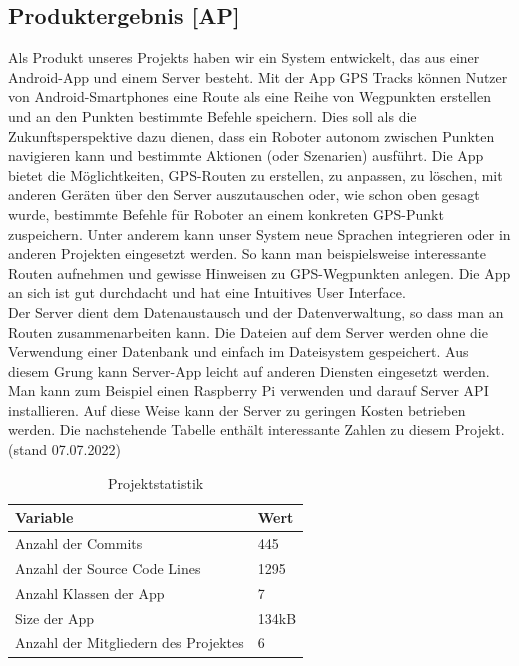 \documentclass[10pt]{article}
\begin{document}
\subsection{Produktergebnis [AP]}
    Als Produkt unseres Projekts haben wir ein System entwickelt, das aus einer Android-App und einem Server besteht.
    Mit der App GPS Tracks können Nutzer von Android-Smartphones eine Route als eine Reihe von Wegpunkten erstellen und an den Punkten bestimmte Befehle speichern.
    Dies soll als die Zukunftsperspektive dazu dienen, dass ein Roboter autonom zwischen Punkten navigieren kann und bestimmte Aktionen (oder Szenarien) ausführt. 
    Die App bietet die Möglichtkeiten, GPS-Routen zu erstellen, zu anpassen, zu löschen, mit anderen Geräten über den Server auszutauschen oder, wie schon oben gesagt wurde, bestimmte Befehle für Roboter
    an einem konkreten GPS-Punkt zuspeichern. Unter anderem kann unser System neue Sprachen integrieren oder in anderen Projekten eingesetzt werden. So kann man beispielsweise interessante Routen aufnehmen und gewisse Hinweisen zu GPS-Wegpunkten anlegen.
    Die App an sich ist gut durchdacht und hat eine Intuitives User Interface. \\ 
    Der Server dient dem Datenaustausch und der Datenverwaltung, so dass man an Routen zusammenarbeiten kann. Die Dateien auf dem Server werden ohne die Verwendung einer Datenbank
    und einfach im Dateisystem gespeichert. Aus diesem Grung kann Server-App leicht auf anderen Diensten eingesetzt werden. Man kann zum Beispiel einen Raspberry Pi verwenden und darauf
    Server API installieren. Auf diese Weise kann der Server zu geringen Kosten betrieben werden. 
    Die nachstehende Tabelle enthält interessante Zahlen zu diesem Projekt. (stand 07.07.2022)
    \begin{table}[H]
        \begin{tabular}{|l|l|}
        \hline
        \textbf{Variable} & \textbf{Wert}                                \\ \hline
        Anzahl der Commits  & 445 \\ \hline
        Anzahl der Source Code Lines  & 1295                 \\ \hline
        Anzahl Klassen der App    & 7                                 \\ \hline
        Size der App    & 134kB                                    \\ \hline
        Anzahl der Mitgliedern des Projektes   & 6                                      \\ \hline
        \end{tabular}
        \centering
        \caption{Projektstatistik}
    \end{table}
\end{document}
